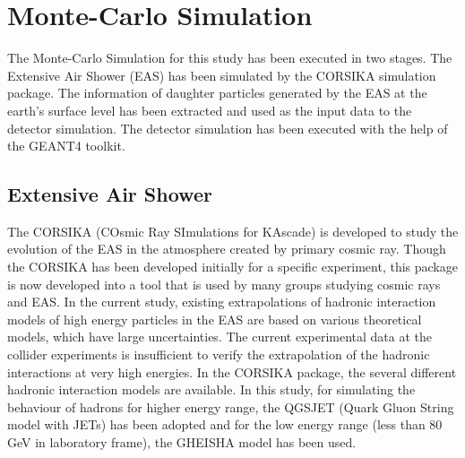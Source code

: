 \section{Monte-Carlo Simulation} \label{sec:montecarlo}
The Monte-Carlo Simulation for this study has been executed in
two stages. The Extensive Air Shower (EAS) has been simulated
by the CORSIKA simulation package\cite{corsika763}. The information
of daughter particles generated by the EAS at the earth's surface
level has been extracted and used as the input data to the detector
simulation. The detector simulation has been executed with the help
of the GEANT4 toolkit\cite{geant4}.

\subsection{Extensive Air Shower}
The CORSIKA (COsmic Ray SImulations for KAscade) is developed to study
the evolution of the EAS in the atmosphere created by primary cosmic
ray. Though the CORSIKA has been developed initially for a specific
experiment, this package is now developed into a tool that is used
by many groups studying cosmic rays and EAS.
In the current study, existing extrapolations of hadronic interaction
models of high energy particles in the EAS are based on
various theoretical models, which have large uncertainties.
The current experimental data at the collider experiments is
insufficient to verify the extrapolation of the hadronic interactions
at very high energies. In the CORSIKA package, the several different
hadronic interaction models are available. In this study, for
simulating the behaviour of hadrons for higher energy range,
the QGSJET (Quark Gluon String model with JETs)\cite{corsika763} has
been adopted and for the low energy range (less than 80\,GeV in
laboratory frame), the GHEISHA model has been used.

